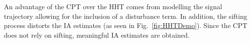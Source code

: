 \documentclass[journal,11pt,a4paper,onecolumn,draftcls]{IEEEtran}
\newcommand{\todo}[1]{\textsf{\emph{\textbf{\textcolor{blue}{#1}}}}}
\begin{document}

An advantage of the CPT over the HHT comes from modelling the signal trajectory allowing for the inclusion of a disturbance term. In addition, the sifting process distorts the IA estimates (as seen in Fig.~\ref{fig:HHTDemo}). Since the CPT does not rely on sifting, meaningful IA estimates are obtained.

\end{document}
